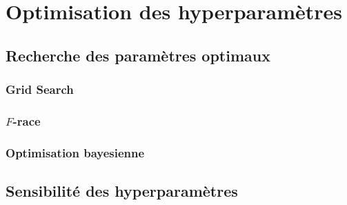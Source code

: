 
\chapter{Optimisation des hyperparamètres}
\label{chap:sept}

\section{Recherche des paramètres optimaux}
\subsection{Grid Search}
\subsection{$F$-race}
\subsection{Optimisation bayesienne}

\section{Sensibilité des hyperparamètres}

\citet{Gelbart2014}
\citet{Gonz2000}
\citet{Snoek2013a}
\citet{Swersky2014}
\citet{Swersky}